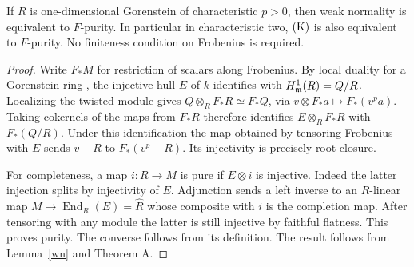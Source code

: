 \begin{corollary}\label{fpure}
If $R$ is one-dimensional Gorenstein of characteristic $p>0$, then weak normality is equivalent to $F$-purity. In particular in characteristic two, $\mathrm{(K)}$ is also equivalent to $F$-purity. No finiteness condition on Frobenius is required.
\end{corollary}
\begin{proof}
Write $F_*M$ for restriction of scalars along Frobenius. By local duality for a Gorenstein ring \cite{BH}, the injective hull $E$ of $k$ identifies with $H^1_{\mathfrak m}(R)=Q/R$. Localizing the twisted module gives $Q\otimes_R F_*R\simeq F_*Q$, via $v\otimes F_*a\mapsto F_*(v^p a)$. Taking cokernels of the maps from $F_*R$ therefore identifies $E\otimes_R F_*R$ with $F_*(Q/R)$. Under this identification the map obtained by tensoring Frobenius with $E$ sends $v+R$ to $F_*(v^p+R)$. Its injectivity is precisely root closure.

For completeness, a map $i:R\to M$ is pure if $E\otimes i$ is injective. Indeed the latter injection splits by injectivity of $E$. Adjunction sends a left inverse to an $R$-linear map $M\to\operatorname{End}_R(E)=\widehat R$ whose composite with $i$ is the completion map. After tensoring with any module the latter is still injective by faithful flatness. This proves purity. The converse follows from its definition. The result follows from Lemma~\ref{wn} and Theorem A.
\end{proof}
